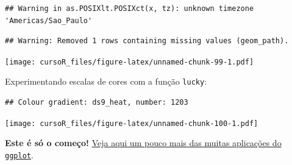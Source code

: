 \documentclass[]{book}
\newenvironment{Shaded}{\begin{snugshade}}{\end{snugshade}}
\newcommand{\KeywordTok}[1]{\textcolor[rgb]{0.13,0.29,0.53}{\textbf{#1}}}
\newcommand{\DataTypeTok}[1]{\textcolor[rgb]{0.13,0.29,0.53}{#1}}
\newcommand{\StringTok}[1]{\textcolor[rgb]{0.31,0.60,0.02}{#1}}
\newcommand{\CommentTok}[1]{\textcolor[rgb]{0.56,0.35,0.01}{\textit{#1}}}
\newcommand{\OperatorTok}[1]{\textcolor[rgb]{0.81,0.36,0.00}{\textbf{#1}}}
\newcommand{\NormalTok}[1]{#1}
\theoremstyle{definition}
\theoremstyle{definition}
\theoremstyle{definition}
\theoremstyle{remark}
\begin{document}
\begin{verbatim}
## Warning in as.POSIXlt.POSIXct(x, tz): unknown timezone 'Americas/Sao_Paulo'
\end{verbatim}

\begin{verbatim}
## Warning: Removed 1 rows containing missing values (geom_path).
\end{verbatim}

\texttt{[image: cursoR\_files/figure-latex/unnamed-chunk-99-1.pdf]}

Experimentando escalas de cores com a função \texttt{lucky}:

\begin{Shaded}
\end{Shaded}

\begin{verbatim}
## Colour gradient: ds9_heat, number: 1203
\end{verbatim}

\texttt{[image: cursoR\_files/figure-latex/unnamed-chunk-100-1.pdf]}

\textbf{Este é só o começo!}
\href{http://r-statistics.co/Top50-Ggplot2-Visualizations-MasterList-R-Code.html}{Veja
aqui um pouco mais das muitas aplicações do \texttt{ggplot}}.
\end{document}
